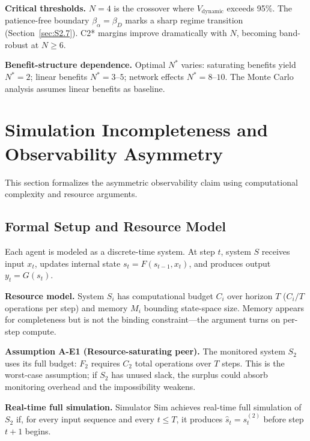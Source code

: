 \documentclass[11pt]{article}
\begin{document}
\textbf{Critical thresholds.} $N = 4$ is the crossover where $V_{\text{dynamic}}$ exceeds 95\%. The patience-free boundary $\beta_\alpha = \beta_D$ marks a sharp regime transition (Section~\ref{sec:S2.7}). C2* margins improve dramatically with $N$, becoming band-robust at $N \geq 6$.

\textbf{Benefit-structure dependence.} Optimal $N^*$ varies: saturating benefits yield $N^*=2$; linear benefits $N^*=3$--$5$; network effects $N^*=8$--$10$. The Monte Carlo analysis assumes linear benefits as baseline.


\section{Simulation Incompleteness and Observability Asymmetry}
\label{sec:S6}

This section formalizes the asymmetric observability claim using computational complexity and resource arguments.

\subsection{Formal Setup and Resource Model}
\label{sec:S6.1}

Each agent is modeled as a discrete-time system. At step $t$, system $S$ receives input $x_t$, updates internal state $s_t = F(s_{t-1}, x_t)$, and produces output $y_t = G(s_t)$.

\textbf{Resource model.} System $S_i$ has computational budget $C_i$ over horizon $T$ ($C_i/T$ operations per step) and memory $M_i$ bounding state-space size. Memory appears for completeness but is not the binding constraint---the argument turns on per-step compute.

\textbf{Assumption A-E1 (Resource-saturating peer).} The monitored system $S_2$ uses its full budget: $F_2$ requires $C_2$ total operations over $T$ steps. This is the worst-case assumption; if $S_2$ has unused slack, the surplus could absorb monitoring overhead and the impossibility weakens.

\textbf{Real-time full simulation.} Simulator $\mathrm{Sim}$ achieves real-time full simulation of $S_2$ if, for every input sequence and every $t \leq T$, it produces $\hat{s}_t = s_t^{(2)}$ before step $t+1$ begins.
\end{document}
